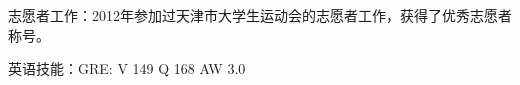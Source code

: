 \begin{cvline}
  \cvsingleline 
  {
  	\begin{cvitems}
    	\item {志愿者工作：2012年参加过天津市大学生运动会的志愿者工作，获得了优秀志愿者称号。}
    	\item {英语技能：GRE: V 149 Q 168 AW 3.0}
    \end{cvitems}
  }
\end{cvline}

